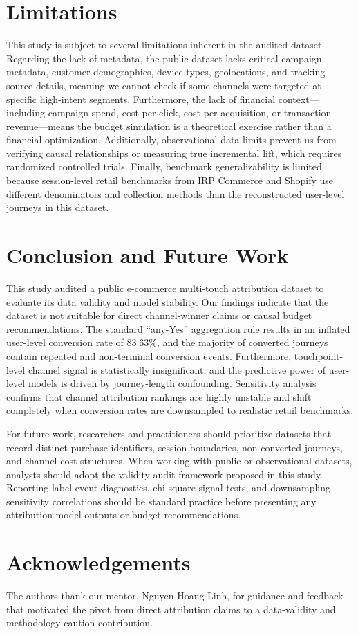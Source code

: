 \documentclass[pdflatex,sn-basic,Numbered]{sn-jnl}
\begin{document}
\section{Limitations}\label{sec:limitations}

This study is subject to several limitations inherent in the audited dataset. Regarding the lack of metadata, the public dataset lacks critical campaign metadata, customer demographics, device types, geolocations, and tracking source details, meaning we cannot check if some channels were targeted at specific high-intent segments. Furthermore, the lack of financial context—including campaign spend, cost-per-click, cost-per-acquisition, or transaction revenue—means the budget simulation is a theoretical exercise rather than a financial optimization. Additionally, observational data limits prevent us from verifying causal relationships or measuring true incremental lift, which requires randomized controlled trials. Finally, benchmark generalizability is limited because session-level retail benchmarks from IRP Commerce and Shopify use different denominators and collection methods than the reconstructed user-level journeys in this dataset.

\section{Conclusion and Future Work}\label{sec:conclusion}

This study audited a public e-commerce multi-touch attribution dataset to evaluate its data validity and model stability. Our findings indicate that the dataset is not suitable for direct channel-winner claims or causal budget recommendations. The standard ``any-Yes'' aggregation rule results in an inflated user-level conversion rate of 83.63\%, and the majority of converted journeys contain repeated and non-terminal conversion events. Furthermore, touchpoint-level channel signal is statistically insignificant, and the predictive power of user-level models is driven by journey-length confounding. Sensitivity analysis confirms that channel attribution rankings are highly unstable and shift completely when conversion rates are downsampled to realistic retail benchmarks.

For future work, researchers and practitioners should prioritize datasets that record distinct purchase identifiers, session boundaries, non-converted journeys, and channel cost structures. When working with public or observational datasets, analysts should adopt the validity audit framework proposed in this study. Reporting label-event diagnostics, chi-square signal tests, and downsampling sensitivity correlations should be standard practice before presenting any attribution model outputs or budget recommendations.

\section*{Acknowledgements}

The authors thank our mentor, Nguyen Hoang Linh, for guidance and feedback that motivated the pivot from direct attribution claims to a data-validity and methodology-caution contribution.


\end{document}
